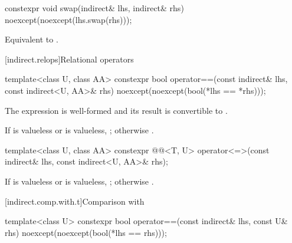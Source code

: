 %
\begin{itemdecl}
constexpr void swap(indirect& lhs, indirect& rhs) noexcept(noexcept(lhs.swap(rhs)));
\end{itemdecl}

\begin{itemdescr}
\pnum
\effects
Equivalent to .
\end{itemdescr}

[indirect.relops]{Relational operators}

%
\begin{itemdecl}
template<class U, class AA>
  constexpr bool operator==(const indirect& lhs, const indirect<U, AA>& rhs)
    noexcept(noexcept(bool(*lhs == *rhs)));
\end{itemdecl}

\begin{itemdescr}
\pnum
\mandates
The expression  is well-formed and
its result is convertible to .

\pnum
\returns
If  is valueless or  is valueless,
;
otherwise .
\end{itemdescr}

%
\begin{itemdecl}
template<class U, class AA>
  constexpr @@<T, U>
    operator<=>(const indirect& lhs, const indirect<U, AA>& rhs);
\end{itemdecl}

\begin{itemdescr}
\pnum
\returns
If  is valueless or  is valueless,
;
otherwise
.
\end{itemdescr}

[indirect.comp.with.t]{Comparison with }

%
\begin{itemdecl}
template<class U>
  constexpr bool operator==(const indirect& lhs, const U& rhs)
    noexcept(noexcept(bool(*lhs == rhs)));
\end{itemdecl}

